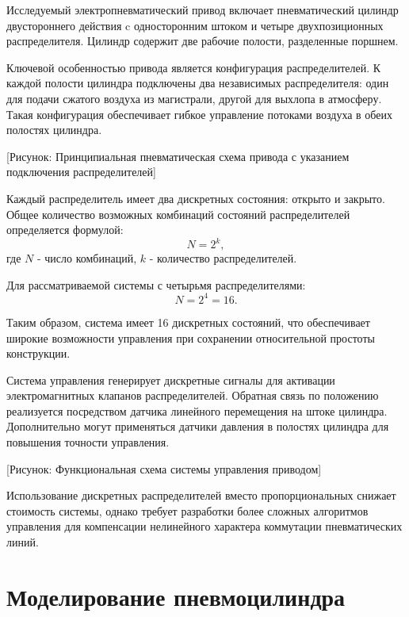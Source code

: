 Исследуемый электропневматический привод включает пневматический цилиндр двустороннего действия
c односторонним штоком и четыре двухпозиционных распределителя.
Цилиндр содержит две рабочие полости, разделенные поршнем.

Ключевой особенностью привода является конфигурация распределителей.
К каждой полости цилиндра подключены два независимых распределителя:
один для подачи сжатого воздуха из магистрали, другой для выхлопа в атмосферу.
Такая конфигурация обеспечивает гибкое управление потоками воздуха в обеих полостях цилиндра.

[Рисунок: Принципиальная пневматическая схема привода с указанием подключения распределителей]

Каждый распределитель имеет два дискретных состояния: открыто и закрыто.
Общее количество возможных комбинаций состояний распределителей
определяется формулой:
\begin{equation*}
    N = 2^k,
\end{equation*}
где $N$ - число комбинаций, $k$ - количество распределителей.

Для рассматриваемой системы с четырьмя распределителями:
\begin{equation*}
    N = 2^4 = 16.
\end{equation*}

Таким образом, система имеет 16 дискретных состояний, что обеспечивает широкие возможности
управления при сохранении относительной простоты конструкции.

Система управления генерирует дискретные сигналы для активации
электромагнитных клапанов распределителей. Обратная связь по положению реализуется посредством датчика линейного перемещения на штоке цилиндра. Дополнительно могут применяться датчики давления в полостях цилиндра для повышения точности управления.

[Рисунок: Функциональная схема системы управления приводом]

Использование дискретных распределителей вместо пропорциональных
снижает стоимость системы, однако требует разработки более сложных
алгоритмов управления для компенсации нелинейного характера коммутации пневматических линий.

\section{Моделирование пневмоцилиндра}\label{sec:ch2/sec2}

